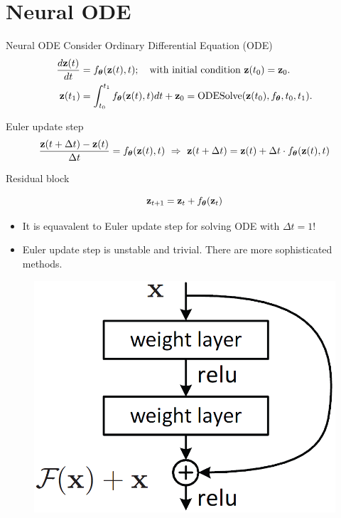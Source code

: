 \section{Neural ODE}
\begin{frame}{Neural ODE}
	Consider Ordinary Differential Equation (ODE)
	\begin{align*}
	    \frac{d \mathbf{z}(t)}{dt} &= f_{\boldsymbol{\theta}}(\mathbf{z}(t), t); \quad \text{with initial condition }\mathbf{z}(t_0) = \mathbf{z}_0. \\
	    \mathbf{z}(t_1) &= \int^{t_1}_{t_0} f_{\boldsymbol{\theta}}(\mathbf{z}(t), t) d t  + \mathbf{z}_0 = \text{ODESolve}(\mathbf{z}(t_0), f_{\boldsymbol{\theta}}, t_0,t_1).
	\end{align*}
	\vspace{-0.4cm}
	\begin{block}{Euler update step}
		\vspace{-0.6cm}
		\[
		    \frac{\mathbf{z}(t + \Delta t) - \mathbf{z}(t)}{\Delta t} = f_{\boldsymbol{\theta}}(\mathbf{z}(t), t) \,\, \Rightarrow \,\, \mathbf{z}(t + \Delta t) = \mathbf{z}(t) + \Delta t \cdot f_{\boldsymbol{\theta}}(\mathbf{z}(t), t)
		\]
		\vspace{-0.7cm}
	\end{block}
	\begin{block}{Residual block}
		\begin{minipage}[t]{0.7\columnwidth}
			\vspace{-0.4cm}
			\[
				\mathbf{z}_{t + 1} = \mathbf{z}_t + f_{\boldsymbol{\theta}}(\mathbf{z}_t)
			\]
			\vspace{-0.6cm}
			\begin{itemize}
				 \item It is equavalent to Euler update step for solving ODE with $\Delta t = 1$!
				 \item Euler update step is unstable and trivial. There are more sophisticated methods.
			\end{itemize}
		\end{minipage}%
		\begin{minipage}[t]{0.3\columnwidth}
			\vspace{-0.2cm}
			\begin{figure}
			    \centering
			    \includegraphics[width=\linewidth]{figs/resnet_1.png}

\end{figure}
\end{minipage}
\end{block}
\end{frame}
